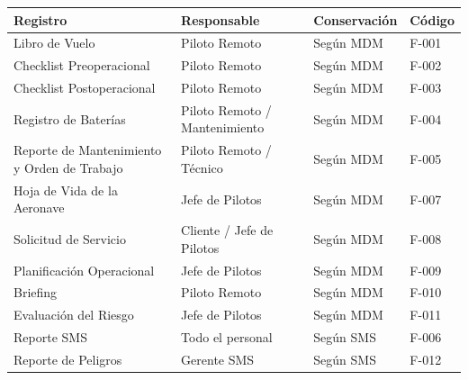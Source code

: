 \begin{longtable}{|p{4cm}|p{5cm}|p{3cm}|p{2cm}|}
\hline

\textbf{Registro} &
\textbf{Responsable} &
\textbf{Conservación} &
\textbf{Código}

\\ \hline

Libro de Vuelo &
Piloto Remoto &
Según MDM &
F-001

\\ \hline

Checklist Preoperacional &
Piloto Remoto &
Según MDM &
F-002

\\ \hline

Checklist Postoperacional &
Piloto Remoto &
Según MDM &
F-003

\\ \hline

Registro de Baterías &
Piloto Remoto / Mantenimiento &
Según MDM &
F-004

\\ \hline

Reporte de Mantenimiento y Orden de Trabajo &
Piloto Remoto / Técnico &
Según MDM &
F-005

\\ \hline

Hoja de Vida de la Aeronave &
Jefe de Pilotos &
Según MDM &
F-007

\\ \hline

Solicitud de Servicio &
Cliente / Jefe de Pilotos &
Según MDM &
F-008

\\ \hline

Planificación Operacional &
Jefe de Pilotos &
Según MDM &
F-009

\\ \hline

Briefing &
Piloto Remoto &
Según MDM &
F-010

\\ \hline

Evaluación del Riesgo &
Jefe de Pilotos &
Según MDM &
F-011

\\ \hline

Reporte SMS &
Todo el personal &
Según SMS &
F-006

\\ \hline

Reporte de Peligros &
Gerente SMS &
Según SMS &
F-012

\\ \hline


\end{longtable}
